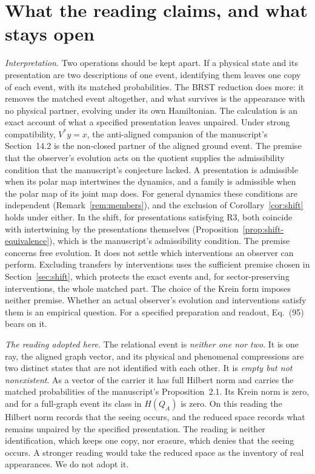 \documentclass[11pt]{article}
\theoremstyle{remark}
\begin{document}
\section{What the reading claims, and what stays open}
\label{sec:reading}

\emph{Interpretation.} Two operations should be kept apart. If a physical state and its presentation are two descriptions of one event, identifying them leaves one copy of each event, with its matched probabilities. The BRST reduction does more: it removes the matched event altogether, and what survives is the appearance with no physical partner, evolving under its own Hamiltonian. The calculation is an exact account of what a specified presentation leaves unpaired. Under strong compatibility, $V^*y=x$, the anti-aligned companion of the manuscript's Section~14.2 is the non-closed partner of the aligned ground event. The premise that the observer's evolution acts on the quotient supplies the admissibility condition that the manuscript's conjecture lacked. A presentation is admissible when its polar map intertwines the dynamics, and a family is admissible when the polar map of its joint map does. For general dynamics these conditions are independent (Remark~\ref{rem:members}), and the exclusion of Corollary~\ref{cor:shift} holds under either. In the shift, for presentations satisfying R3, both coincide with intertwining by the presentations themselves (Proposition~\ref{prop:shift-equivalence}), which is the manuscript's admissibility condition. The premise concerns free evolution. It does not settle which interventions an observer can perform. Excluding transfers by interventions uses the sufficient premise chosen in Section~\ref{sec:shift}, which protects the exact events and, for sector-preserving interventions, the whole matched part. The choice of the Krein form imposes neither premise. Whether an actual observer's evolution and interventions satisfy them is an empirical question. For a specified preparation and readout, Eq.~(95) bears on it.

\emph{The reading adopted here.} The relational event is \emph{neither one nor two}. It is one ray, the aligned graph vector, and its physical and phenomenal compressions are two distinct states that are not identified with each other. It is \emph{empty but not nonexistent}. As a vector of the carrier it has full Hilbert norm and carries the matched probabilities of the manuscript's Proposition~2.1. Its Krein norm is zero, and for a full-graph event its class in $H(Q_A)$ is zero. On this reading the Hilbert norm records that the seeing occurs, and the reduced space records what remains unpaired by the specified presentation. The reading is neither identification, which keeps one copy, nor erasure, which denies that the seeing occurs. A stronger reading would take the reduced space as the inventory of real appearances. We do not adopt it.
\end{document}
